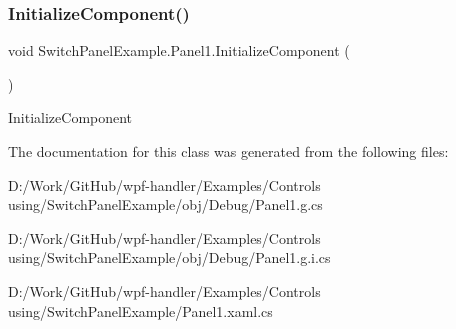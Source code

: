 \subsubsection{\texorpdfstring{Initialize\+Component()}{InitializeComponent()}\hspace{0.1cm}{\footnotesize\ttfamily [2/2]}}
{\footnotesize\ttfamily void Switch\+Panel\+Example.\+Panel1.\+Initialize\+Component (\begin{DoxyParamCaption}{ }\end{DoxyParamCaption})}



Initialize\+Component 



The documentation for this class was generated from the following files\+:\begin{DoxyCompactItemize}
\item 
D\+:/\+Work/\+Git\+Hub/wpf-\/handler/\+Examples/\+Controls using/\+Switch\+Panel\+Example/obj/\+Debug/Panel1.\+g.\+cs\item 
D\+:/\+Work/\+Git\+Hub/wpf-\/handler/\+Examples/\+Controls using/\+Switch\+Panel\+Example/obj/\+Debug/Panel1.\+g.\+i.\+cs\item 
D\+:/\+Work/\+Git\+Hub/wpf-\/handler/\+Examples/\+Controls using/\+Switch\+Panel\+Example/Panel1.\+xaml.\+cs\end{DoxyCompactItemize}
